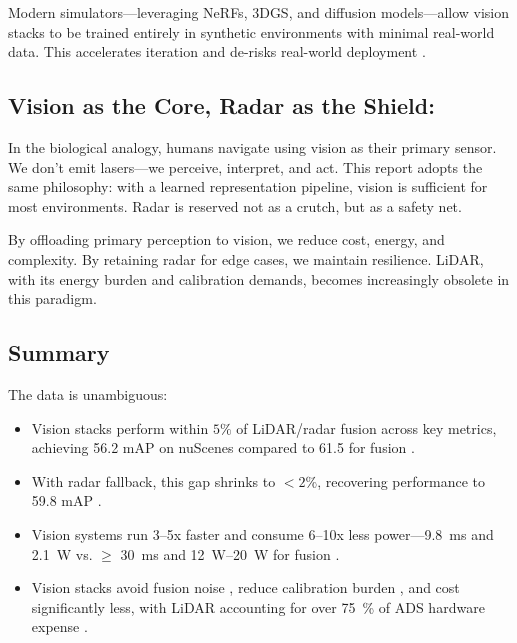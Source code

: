 \documentclass[12pt]{article}
\begin{document}
Modern simulators—leveraging NeRFs, 3DGS, and diffusion models—allow vision stacks to be trained entirely in synthetic environments with minimal real-world data. This accelerates iteration and de-risks real-world deployment \autocite{Haghighi2024}.

\subsection{Vision as the Core, Radar as the Shield:}

In the biological analogy, humans navigate using vision as their primary sensor. We don’t emit lasers—we perceive, interpret, and act. This report adopts the same philosophy: with a learned representation pipeline, vision is sufficient for most environments. Radar is reserved not as a crutch, but as a safety net.

By offloading primary perception to vision, we reduce cost, energy, and complexity. By retaining radar for edge cases, we maintain resilience. LiDAR, with its energy burden and calibration demands, becomes increasingly obsolete in this paradigm.

\subsection{Summary}

The data is unambiguous:

\begin{itemize}
  \item Vision stacks perform within $5\%$ of LiDAR/radar fusion across key metrics, achieving 56.2 mAP on nuScenes compared to 61.5 for fusion \autocite{Zhang2023MultiSensorFusionSurvey}.
  \item With radar fallback, this gap shrinks to $<2\%$, recovering performance to 59.8 mAP \autocite{Liao2024RadarVisionFusion}.
  \item Vision systems run 3–5x faster and consume 6–10x less
		power—\SI{9.8}{\milli\second} and \SI{2.1}{\watt} vs. $\geq$ \SI{30}{\milli\second} and \SIrange{12}{20}{\watt} for fusion \autocite{Chen2024EndToEndAD, Rana2023PerceptionSystems}.
  \item Vision stacks avoid fusion noise \autocite{Rana2023PerceptionSystems}, reduce calibration burden \autocite{Han2023FourDRadarSurvey}, and cost significantly less, with LiDAR accounting for over \SI{75}{\percent} of ADS hardware expense \autocite{Shetty2022LiDARvsCamera, Sajjad2021ComparativeDetection}.
\end{itemize}
\end{document}
